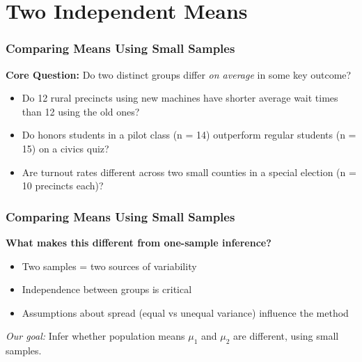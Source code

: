 \documentclass[handout]{beamer}
\begin{document}
\section{Two Independent Means}




\begin{frame}
\frametitle{Comparing Means Using Small Samples}

\textbf{Core Question:} Do two distinct groups differ \emph{on average} in some key outcome?

\vspace{1em}
\begin{itemize}
  \item Do 12 rural precincts using new machines have shorter average wait times than 12 using the old ones?
  \item Do honors students in a pilot class (n = 14) outperform regular students (n = 15) on a civics quiz?
  \item Are turnout rates different across two small counties in a special election (n = 10 precincts each)?
\end{itemize}
\end{frame}

\begin{frame}
\frametitle{Comparing Means Using Small Samples}

\textbf{What makes this different from one-sample inference?}
\begin{itemize}
  \item Two samples = two sources of variability
  \item Independence between groups is critical
  \item Assumptions about spread (equal vs unequal variance) influence the method
\end{itemize}

\vspace{1em}
\pause
\textit{Our goal:} Infer whether population means \(\mu_1\) and \(\mu_2\) are different, using small samples.
\end{frame}
\end{document}
